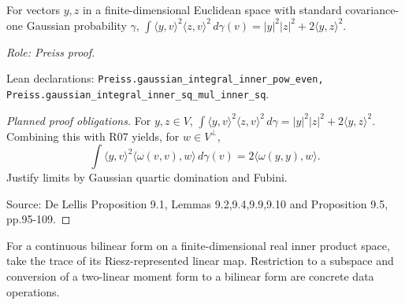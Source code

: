 \begin{lemma}
\label{lem:gaussian-wick-fourth}





For vectors $y,z$ in a finite-dimensional Euclidean space with standard covariance-one Gaussian probability $\gamma$, $\int\langle y,v\rangle^2\langle z,v\rangle^2\,d\gamma(v)=|y|^2|z|^2+2\langle y,z\rangle^2$.
\par\emph{Role: Preiss proof.}
\par Lean declarations: \texttt{Preiss.gaussian\_integral\_inner\_pow\_even, Preiss.gaussian\_integral\_inner\_sq\_mul\_inner\_sq}.
\end{lemma}
\begin{proof}[Planned proof obligations]

For $y,z\in V$,
$\int\langle y,v\rangle^2\langle z,v\rangle^2\,d\gamma
=|y|^2|z|^2+2\langle y,z\rangle^2$.
Combining this with R07 yields, for $w\in V^\perp$,
\[
 \int\langle y,v\rangle^2\langle\omega(v,v),w\rangle\,d\gamma(v)
 =2\langle\omega(y,y),w\rangle.
\]
Justify limits by Gaussian quartic domination and Fubini.
\par Source: De Lellis Proposition 9.1, Lemmas 9.2,9.4,9.9,9.10 and Proposition 9.5, pp.95-109.
\end{proof}

\begin{definition}
\label{def:bilinear-trace}


For a continuous bilinear form on a finite-dimensional real inner product space, take the trace of its Riesz-represented linear map. Restriction to a subspace and conversion of a two-linear moment form to a bilinear form are concrete data operations.
\end{definition}

